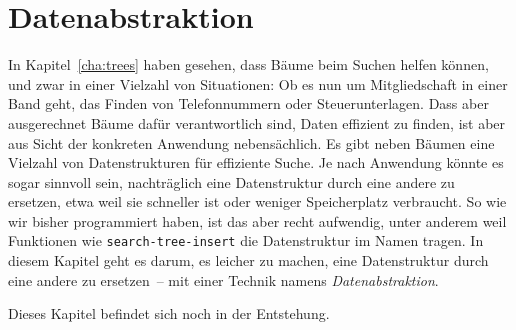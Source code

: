 
\chapter{Datenabstraktion}
\label{chap:datenabstraktion}

In Kapitel~\ref{cha:trees} haben gesehen, dass Bäume beim Suchen
helfen können, und zwar in einer Vielzahl von Situationen: Ob es nun
um Mitgliedschaft in einer Band geht, das Finden von Telefonnummern
oder Steuerunterlagen.  Dass aber ausgerechnet Bäume dafür
verantwortlich sind, Daten effizient zu finden, ist aber aus Sicht der
konkreten Anwendung nebensächlich.  Es gibt neben Bäumen eine Vielzahl
von Datenstrukturen für effiziente Suche.  Je nach Anwendung könnte es
sogar sinnvoll sein, nachträglich eine Datenstruktur durch eine andere
zu ersetzen, etwa weil sie schneller ist oder weniger Speicherplatz
verbraucht.  So wie wir bisher programmiert haben, ist das aber recht
aufwendig, unter anderem weil Funktionen wie
\lstinline{search-tree-insert} die Datenstruktur im Namen tragen.  In
diesem Kapitel geht es darum, es leicher zu machen, eine Datenstruktur
durch eine andere zu ersetzen~-- mit einer Technik namens
\textit{Datenabstraktion}.

Dieses Kapitel befindet sich noch in der Entstehung.


